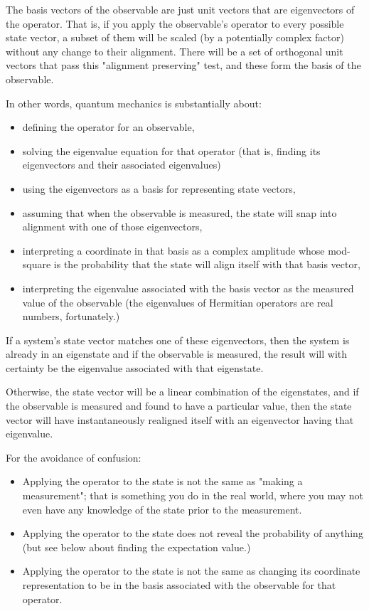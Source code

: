 The basis vectors of the observable are just unit vectors that are eigenvectors of the operator. That is, if you apply the observable's operator to every possible state vector, a subset of them will be scaled (by a potentially complex factor) without any change to their alignment. There will be a set of orthogonal unit vectors that pass this "alignment preserving" test, and these form the basis of the observable.

In other words, quantum mechanics is substantially about:

\begin{itemize}
  \item defining the operator for an observable,
  \item solving the eigenvalue equation for that operator (that is, finding its eigenvectors and their associated eigenvalues)
  \item using the eigenvectors as a basis for representing state vectors,
  \item assuming that when the observable is measured, the state will snap into alignment with one of those eigenvectors,
  \item interpreting a coordinate in that basis as a complex amplitude whose mod-square is the probability that the state will align itself with that basis vector,
  \item interpreting the eigenvalue associated with the basis vector as the measured value of the observable (the eigenvalues of Hermitian operators are real numbers, fortunately.)
\end{itemize}

If a system's state vector matches one of these eigenvectors, then the system is already in an eigenstate and if the observable is measured, the result will with certainty be the eigenvalue associated with that eigenstate.

Otherwise, the state vector will be a linear combination of the eigenstates, and if the observable is measured and found to have a particular value, then the state vector will have instantaneously realigned itself with an eigenvector having that eigenvalue.

For the avoidance of confusion:

\begin{itemize}
  \item Applying the operator to the state is not the same as "making a measurement"; that is something you do in the real world, where you may not even have any knowledge of the state prior to the measurement.
  \item Applying the operator to the state does not reveal the probability of anything (but see below about finding the expectation value.)
  \item Applying the operator to the state is not the same as changing its coordinate representation to be in the basis associated with the observable for that operator.
\end{itemize}

